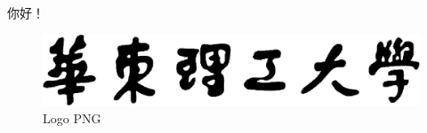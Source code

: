 \documentclass{ecust_thesis_openning}
\begin{document}
你好！
\begin{figure}[!hbp]
  \center\includegraphics[width=\textwidth]{img/ecust_words_logo_png}
  \caption{Logo PNG} \label{logo_png}
\end{figure}
\end{document}
